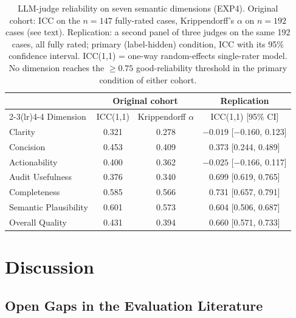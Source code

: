 \documentclass[fleqn,10pt,lineno]{wlpeerj}
\begin{document}
\begin{table}[t]
\centering
\caption{LLM-judge reliability on seven semantic dimensions (EXP4). Original
cohort: ICC on the $n=147$ fully-rated cases, Krippendorff's $\alpha$ on
$n=192$ cases (see text). Replication: a second panel of three judges on the
same 192 cases, all fully rated; primary (label-hidden) condition, ICC with
its 95\% confidence interval. ICC(1,1) = one-way random-effects single-rater
model. No dimension reaches the $\geq 0.75$ good-reliability threshold
\citep{koo2016guideline} in the primary condition of either cohort.}
\label{tab:exp4_icc}
\small
\begin{tabular}{lccc}
\toprule
                       & \multicolumn{2}{c}{Original cohort} & Replication \\
\cmidrule(lr){2-3}\cmidrule(lr){4-4}
Dimension              & ICC(1,1) & Krippendorff $\alpha$ & ICC(1,1) [95\% CI] \\
\midrule
Clarity                & 0.321    & 0.278 & $-0.019$ [$-0.160$, 0.123] \\
Concision              & 0.453    & 0.409 & 0.373 [0.244, 0.489] \\
Actionability          & 0.400    & 0.362 & $-0.025$ [$-0.166$, 0.117] \\
Audit Usefulness       & 0.376    & 0.340 & 0.699 [0.619, 0.765] \\
Completeness           & 0.585    & 0.566 & 0.731 [0.657, 0.791] \\
Semantic Plausibility  & 0.601    & 0.573 & 0.604 [0.506, 0.687] \\
Overall Quality        & 0.431    & 0.394 & 0.660 [0.571, 0.733] \\
\bottomrule
\end{tabular}
\end{table}


\section{Discussion}
\label{sec:discussion}


\subsection{Open Gaps in the Evaluation Literature}
\label{sec:synthesis}
\end{document}
